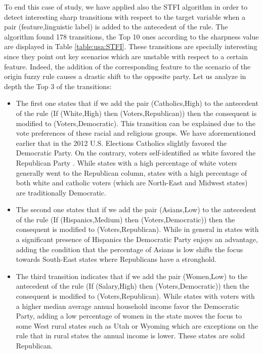 To end this case of study, we have applied also the STFI algorithm in order to detect interesting sharp transitions with respect to the target variable when a pair (feature,linguistic label) is added to the antecedent of the rule. The algorithm found 178 transitions, the Top 10 ones according to the sharpness value are displayed in Table \ref{table:usa:STFI}. These transitions are specially interesting since they point out key scenarios which are unstable with respect to a certain feature. Indeed, the addition of the corresponding feature to the scenario of the origin fuzzy rule causes a drastic shift to the opposite party. Let us analyze in depth the Top 3 of the transitions:
\begin{itemize}
	\item The first one states that if we add the pair (Catholics,High) to the antecedent of the rule (If (White,High) then (Voters,Republican)) then the consequent is modified to (Voters,Democratic). This transition can be explained due to the vote preferences of these racial and religious groups. We have aforementioned earlier that in the 2012 U.S. Elections Catholics slightly favored the Democratic Party. On the contrary, voters self-identified as white favored the Republican Party \cite{Cillizza2012}. While states with a high percentage of white voters generally went to the Republican column, states with a high percentage of both white and catholic voters (which are North-East and Midwest states) are traditionally Democratic.
	\item  The second one states that if we add the pair (Asians,Low) to the antecedent of the rule (If (Hispanics,Medium) then (Voters,Democratic)) then the consequent is modified to (Voters,Republican). While in general in states with a significant presence of Hispanics the Democratic Party enjoys an advantage, adding the condition that the percentage of Asians is low shifts the focus towards South-East states where Republicans have a stronghold. 
	\item The third transition indicates that if we add the pair (Women,Low) to the antecedent of the rule (If (Salary,High) then (Voters,Democratic)) then the consequent is modified to (Voters,Republican). While states with voters with a higher median average annual household income favor the Democratic Party, adding a low percentage of women in the state moves the focus to some West rural states such as Utah or Wyoming which are exceptions on the rule that in rural states the annual income is lower. These states are solid Republican. 
\end{itemize}  


